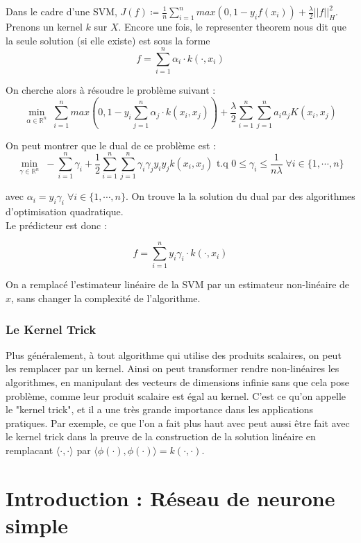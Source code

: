 \documentclass[a4paper, 11pt, french]{article}
\theoremstyle{definition}
\begin{document}
	Dans le cadre d'une SVM, $J(f) \coloneqq \frac{1}{n} \sum_{i=1}^{n} max(0, 1 - y_i f(x_i)) + \frac{\lambda}{2} ||f||_H^2$. Prenons un kernel $k$ sur $X$. Encore une fois, le representer theorem nous dit que la seule solution (si elle existe) est sous la forme
	\[f = \sum_{i=1}^{n} \alpha_i \cdot k(\cdot, x_i)\]
	
	On cherche alors à résoudre le problème suivant :
	\[\min_{\alpha \in \mathbb{R}^n} \; \sum_{i=1}^{n} max(0, 1 - y_i \sum_{j=1}^{n} \alpha_j \cdot k(x_i, x_j))  + \frac{\lambda}{2} \sum_{i=1}^{n} \sum_{j=1}^{n} a_i a_j K(x_i, x_j)\]
	
	 On peut montrer que le dual de ce problème est :
	\[\min_{\gamma \in \mathbb{R}^n} \; -\sum_{i=1}^{n} \gamma_i + \frac{1}{2} \sum_{i=1}^{n} \sum_{j=1}^{n} \gamma_i \gamma_j y_i y_j k(x_i, x_j) \text{ t.q } 0 \leq \gamma_i \leq \frac{1}{n \lambda} \; \forall i \in \{1, \cdots, n\}\]
	
	avec $\alpha_i = y_i \gamma_i \; \forall i \in \{1, \cdots, n\}$. On trouve la la solution du dual par des algorithmes d'optimisation quadratique. \\
	
	Le prédicteur est donc :
	
	\[f = \sum_{i=1}^{n} y_i \gamma_i \cdot k(\cdot, x_i)\]
	
	On a remplacé l'estimateur linéaire de la SVM par un estimateur non-linéaire de $x$, sans changer la complexité de l'algorithme.
	
	\subsubsection{Le Kernel Trick}
	
	Plus généralement, à tout algorithme qui utilise des produits scalaires, on peut les remplacer par un kernel. Ainsi on peut transformer rendre non-linéaires les algorithmes, en manipulant des vecteurs de dimensions infinie sans que cela pose problème, comme leur produit scalaire est égal au kernel. C'est ce qu'on appelle le "kernel trick", et il a une très grande importance dans les applications pratiques. Par exemple, ce que l'on a fait plus haut avec peut aussi être fait avec le kernel trick dans la preuve de la construction de la solution linéaire en remplacant $\langle \cdot, \cdot \rangle$ par $\langle \phi(\cdot), \phi(\cdot) \rangle = k(\cdot, \cdot)$.
	
	\newpage
	
	\section{Introduction : Réseau de neurone simple}
	
\end{document}
